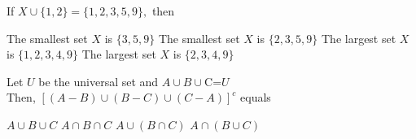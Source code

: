 \documentclass{exam}
\begin{document}


\begin{questions}

\question \label{m1q1-01}  If $ X\cup \{1,2\}=\{1,2,3,5,9\},$ then
    \begin{choices}
        \correctchoice The smallest set $X$ is $\{3,5,9\} $
        \choice The smallest set $X$ is $\{2,3,5,9\}$
        \choice The largest set $X$ is $\{1,2,3,4,9\}$
        \choice The largest set $X$ is $\{2,3,4,9\}$
    \end{choices}

\question \label{m1q1-02}  Let $U$ be the universal set and $A\cup B \cup $C=$U$\\
            Then, $[(A-B)\cup(B-C)\cup(C-A)]^c$ equals
    \begin{choices}
        \correctchoice $ A \cup B\cup C $
        \choice $ A \cap B \cap C $
        \choice $ A\cup (B \cap C ) $
        \choice $ A \cap (B \cup C ) $
    \end{choices}
    
\end{questions}
\end{document}
